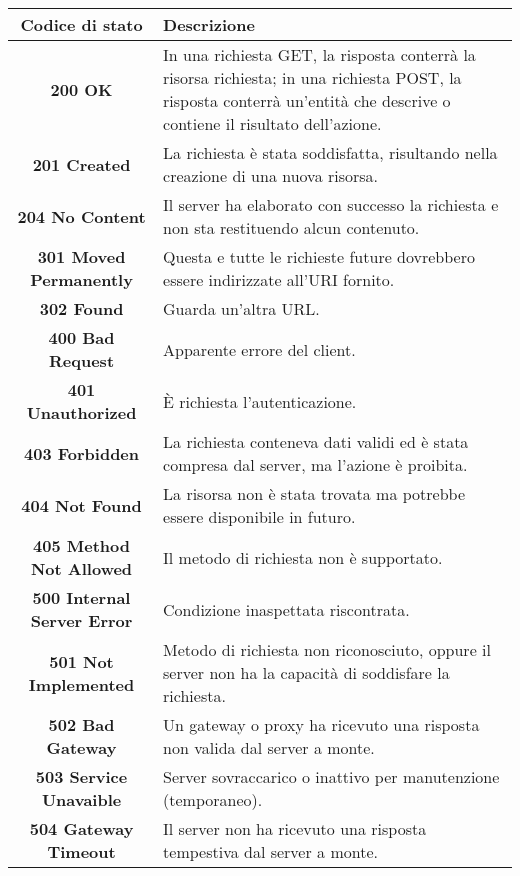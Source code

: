 \documentclass[12pt]{article}
\begin{document}
\begin{center}
\begin{tabularx}{\textwidth}{ |c|X| }
\hline
\textbf{Codice di stato} & \textbf{Descrizione}\\
\hline\hline
\textbf{200 OK} & In una richiesta GET, la risposta conterrà la risorsa richiesta; in una richiesta POST, la risposta conterrà un'entità che descrive o contiene il risultato dell'azione.\\
\hline
\textbf{201 Created} & La richiesta è stata soddisfatta, risultando nella creazione di una nuova risorsa.\\
\hline
\textbf{204 No Content} & Il server ha elaborato con successo la richiesta e non sta restituendo alcun contenuto.\\
\hline
\textbf{301 Moved Permanently} & Questa e tutte le richieste future dovrebbero essere indirizzate all'URI fornito.\\
\hline
\textbf{302 Found} & Guarda un'altra URL.\\
\hline
\textbf{400 Bad Request} & Apparente errore del client.\\
\hline
\textbf{401 Unauthorized} & È richiesta l'autenticazione.\\
\hline
\textbf{403 Forbidden} & La richiesta conteneva dati validi ed è stata compresa dal server, ma l'azione è proibita.\\
\hline
\textbf{404 Not Found} & La risorsa non è stata trovata ma potrebbe essere disponibile in futuro.\\
\hline
\textbf{405 Method Not Allowed} & Il metodo di richiesta non è supportato.\\
\hline
\textbf{500 Internal Server Error} & Condizione inaspettata riscontrata.\\
\hline
\textbf{501 Not Implemented} & Metodo di richiesta non riconosciuto, oppure il server non ha la capacità di soddisfare la richiesta.\\
\hline
\textbf{502 Bad Gateway} & Un gateway o proxy ha ricevuto una risposta non valida dal server a monte.\\
\hline
\textbf{503 Service Unavaible} & Server sovraccarico o inattivo per manutenzione (temporaneo).\\
\hline
\textbf{504 Gateway Timeout} & Il server non ha ricevuto una risposta tempestiva dal server a monte.\\
\hline
\end{tabularx}
\end{center}

\newpage
\end{document}

